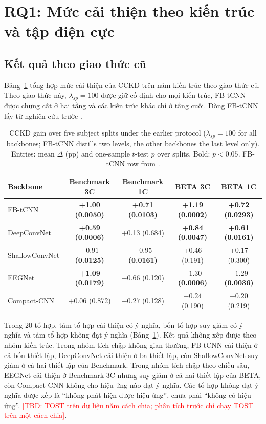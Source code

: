 \documentclass[10pt]{article} %
\newcommand{\tbd}[1]{\textcolor{red}{[TBD: #1]}}
\begin{document}
\section{RQ1: Mức cải thiện theo kiến trúc và tập điện cực}
\label{sec:rq1}
\label{sec:results}
\label{sec:generalization}

\subsection{Kết quả theo giao thức cũ}

Bảng~\ref{tab:five_backbones} tổng hợp mức cải thiện của CCKD trên năm kiến trúc theo giao thức cũ. Theo giao thức này, $\lambda_{sp}=100$ được giữ cố định cho mọi kiến trúc, FB-tCNN được chưng cất ở hai tầng và các kiến trúc khác chỉ ở tầng cuối. Dòng FB-tCNN lấy từ nghiên cứu trước \citep{icera2026cckd}.

\begin{table}[h]
\caption{CCKD gain over five subject splits under the earlier protocol ($\lambda_{sp}=100$ for all backbones; FB-tCNN distills two levels, the other backbones the last level only). Entries: mean $\Delta$ (pp) and one-sample $t$-test $p$ over splits. Bold: $p<0.05$. FB-tCNN row from \citet{icera2026cckd}.}
\label{tab:five_backbones}
\begin{center}
\begin{tabular}{lcccc}
\toprule
Backbone & Benchmark 3C & Benchmark 1C & BETA 3C & BETA 1C \\
\midrule
FB-tCNN & \textbf{+1.00 (0.0050)} & \textbf{+0.71 (0.0103)} & \textbf{+1.19 (0.0002)} & \textbf{+0.72 (0.0293)} \\
DeepConvNet & \textbf{+0.59 (0.0006)} & +0.13 (0.684) & \textbf{+0.84 (0.0047)} & \textbf{+0.61 (0.0161)} \\
ShallowConvNet & \textbf{$-0.91$ (0.0125)} & \textbf{$-0.95$ (0.0161)} & +0.46 (0.191) & +0.17 (0.300) \\
EEGNet & \textbf{+1.09 (0.0179)} & $-0.66$ (0.120) & \textbf{$-1.30$ (0.0006)} & \textbf{$-1.29$ (0.0036)} \\
Compact-CNN & +0.06 (0.872) & $-0.27$ (0.128) & $-0.24$ (0.190) & $-0.20$ (0.219) \\
\bottomrule
\end{tabular}
\end{center}
\end{table}

Trong 20 tổ hợp, tám tổ hợp cải thiện có ý nghĩa, bốn tổ hợp suy giảm có ý nghĩa và tám tổ hợp không đạt ý nghĩa (Bảng~\ref{tab:five_backbones}). Kết quả không xếp được theo nhóm kiến trúc. Trong nhóm tích chập không gian thường, FB-tCNN cải thiện ở cả bốn thiết lập, DeepConvNet cải thiện ở ba thiết lập, còn ShallowConvNet suy giảm ở cả hai thiết lập của Benchmark. Trong nhóm tích chập theo chiều sâu, EEGNet cải thiện ở Benchmark-3C nhưng suy giảm ở cả hai thiết lập của BETA, còn Compact-CNN không cho hiệu ứng nào đạt ý nghĩa. Các tổ hợp không đạt ý nghĩa được xếp là ``không phát hiện được hiệu ứng'', chưa phải ``không có hiệu ứng''. \tbd{TOST trên dữ liệu năm cách chia; phân tích trước chỉ chạy TOST trên một cách chia}.
\end{document}
